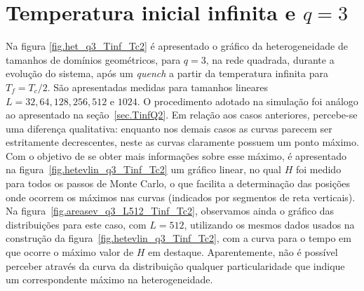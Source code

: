 \section{Temperatura inicial infinita e $q=3$}
\label{sec.TinfQ3}

Na figura \ref{fig.het_q3_Tinf_Tc2} é apresentado o gráfico da heterogeneidade de tamanhos de domínios geométricos, para $q=3$, na rede quadrada, durante a evolução do sistema, após um \textit{quench} a partir da temperatura infinita para $T_f=T_c/2$. São apresentadas medidas para tamanhos lineares $L=32, 64, 128, 256, 512$ e $1024$. O procedimento adotado na simulação foi análogo ao apresentado na seção~\ref{sec.TinfQ2}. Em relação aos casos anteriores, percebe-se uma diferença qualitativa: enquanto nos demais casos as curvas parecem ser estritamente decrescentes, neste as curvas claramente possuem um ponto máximo. Com o objetivo de se obter mais informações sobre esse máximo, é apresentado na figura~\ref{fig.hetevlin_q3_Tinf_Tc2} um gráfico linear, no qual $H$ foi medido para todos os passos de Monte Carlo, o que facilita a determinação das posições onde ocorrem os máximos nas curvas (indicados por segmentos de reta verticais). Na figura~\ref{fig.areasev_q3_L512_Tinf_Tc2}, observamos ainda o gráfico das distribuições para este caso, com $L=512$, utilizando os mesmos dados usados na construção da figura~\ref{fig.hetevlin_q3_Tinf_Tc2}, com a curva para o tempo em que ocorre o máximo valor de $H$ em destaque. Aparentemente, não é possível perceber através da curva da distribuição qualquer particularidade que indique um correspondente máximo na heterogeneidade.


